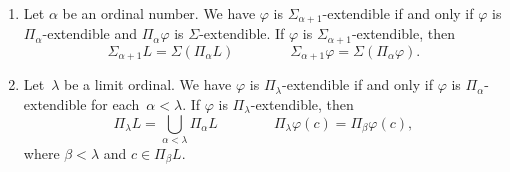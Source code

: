 \documentclass[main.tex]{subfiles}
\begin{document}
\begin{prop}
\begin{enumerate}
\item
Let $\alpha$ be an ordinal number.
We have 
$\varphi$ is {$\Sigma_{\alpha+1}$-extendible}
if and only if $\varphi$ is $\Pi_{\alpha}$-extendible
and $\Pi_\alpha \varphi$ is $\Sigma$-extendible.
If $\varphi$ is $\Sigma_{\alpha+1}$-extendible,
then 
\begin{equation*}
\Sigma_{\alpha+1} L = \Sigma(\Pi_\alpha L)\qquad\qquad
\Sigma_{\alpha+1} \varphi = \Sigma(\Pi_\alpha \varphi).
\end{equation*}

\item
Let~$\lambda$ be a limit ordinal.
We have $\varphi$ is {$\Pi_\lambda$-extendible}
if and only if $\varphi$ is $\Pi_\alpha$-extendible
for each~$\alpha < \lambda$.
If $\varphi$ is $\Pi_\lambda$-extendible,
then 
\begin{equation*}
\Pi_\lambda L = \textstyle{\bigcup_{\alpha < \lambda} \Pi_\alpha L}
\qquad\qquad
\Pi_\lambda \varphi (c) = \Pi_\beta \varphi(c),
\end{equation*}
where $\beta < \lambda$ and $c\in \Pi_\beta L$.


\end{enumerate}
\end{prop}
\end{document}
